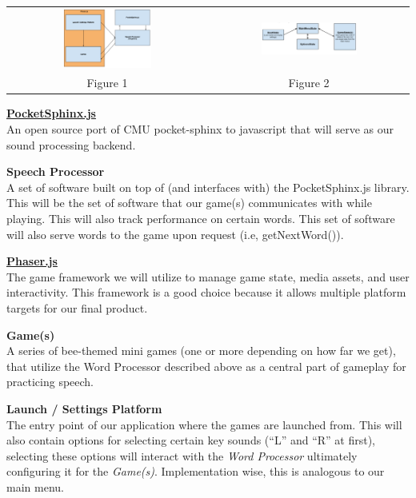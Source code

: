 \documentclass{article}
\begin{document}
\begin{tabular}{cc}
    \centering
    \includegraphics[width=0.46\textwidth]{outline.png} & \includegraphics[width=0.5\textwidth]{states.png}\\
    Figure 1 & Figure 2
\end{tabular}

\newpage

\href{http://syl22-00.github.io/pocketsphinx.js/}{\textbf{PocketSphinx.js}}\\
An open source port of CMU pocket-sphinx to javascript that will serve as our sound processing backend.

\textbf{Speech Processor}\\
A set of software built on top of (and interfaces with) the PocketSphinx.js library. This will be the set of software that our game(s) communicates with while playing. This will also track performance on certain words. This set of software will also serve words to the game upon request (i.e, getNextWord()).

\href{http://phaser.io/}{\textbf{Phaser.js}}\\
The game framework we will utilize to manage game state, media assets, and user interactivity. This framework is a good choice because it allows multiple platform targets for our final product.

\textbf{Game(s)}\\
A series of bee-themed mini games (one or more depending on how far we get), that utilize the Word Processor described above as a central part of gameplay for practicing speech.

\textbf{Launch / Settings Platform}\\
The entry point of our application where the games are launched from. This will also contain options for selecting certain key sounds (``L'' and ``R'' at first), selecting these options will interact with the \textit{Word Processor} ultimately configuring it for the \textit{Game(s)}. Implementation wise, this is analogous to our main menu.
\end{document}
